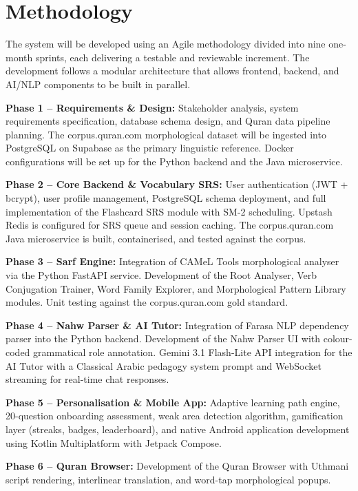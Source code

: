 \documentclass[A4paper,12pt]{article}
\begin{document}
\section{Methodology}

The system will be developed using an Agile methodology divided into nine one-month sprints,
each delivering a testable and reviewable increment. The development follows a modular
architecture that allows frontend, backend, and AI/NLP components to be built in parallel.

\textbf{Phase 1 -- Requirements \& Design:} Stakeholder analysis,
system requirements specification, database schema design, and Quran data pipeline planning.
The corpus.quran.com morphological dataset will be ingested into PostgreSQL on Supabase as
the primary linguistic reference. Docker configurations will be set up for the Python backend
and the Java microservice.

\textbf{Phase 2 -- Core Backend \& Vocabulary SRS:} User
authentication (JWT + bcrypt), user profile management, PostgreSQL schema deployment, and
full implementation of the Flashcard SRS module with SM-2 scheduling. Upstash Redis is
configured for SRS queue and session caching. The corpus.quran.com Java microservice is
built, containerised, and tested against the corpus.

\textbf{Phase 3 -- Sarf Engine:} Integration of CAMeL Tools
morphological analyser via the Python FastAPI service. Development of the Root Analyser,
Verb Conjugation Trainer, Word Family Explorer, and Morphological Pattern Library modules.
Unit testing against the corpus.quran.com gold standard.

\textbf{Phase 4 -- Nahw Parser \& AI Tutor:} Integration of
Farasa NLP dependency parser into the Python backend. Development of the Nahw Parser UI
with colour-coded grammatical role annotation. Gemini 3.1 Flash-Lite API integration for
the AI Tutor with a Classical Arabic pedagogy system prompt and WebSocket streaming for
real-time chat responses.

\textbf{Phase 5 -- Personalisation \& Mobile App:} Adaptive
learning path engine, 20-question onboarding assessment, weak area detection algorithm,
gamification layer (streaks, badges, leaderboard), and native Android application development
using Kotlin Multiplatform with Jetpack Compose.

\textbf{Phase 6 -- Quran Browser:} Development
of the Quran Browser with Uthmani script rendering, interlinear translation, and word-tap
morphological popups.
\end{document}
